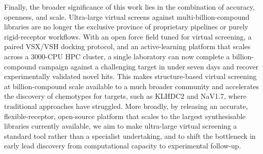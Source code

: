 \documentclass[11pt]{article}
\begin{document}
Finally, the broader significance of this work lies in the combination of
accuracy, openness, and scale. Ultra-large virtual screens against
multi-billion-compound libraries are no longer the exclusive province of
proprietary pipelines or purely rigid-receptor workflows. With an open
force field tuned for virtual screening, a paired VSX/VSH docking
protocol, and an active-learning platform that scales across a
3000-CPU HPC cluster, a single laboratory can now complete a
billion-compound campaign against a challenging target in under seven
days and recover experimentally validated novel hits. This makes
structure-based virtual screening at billion-compound scale available to
a much broader community and accelerates the discovery of chemotypes for
targets, such as KLHDC2 and NaV1.7, where traditional approaches have
struggled. More broadly, by releasing an accurate, flexible-receptor,
open-source platform that scales to the largest synthesisable libraries
currently available, we aim to make ultra-large virtual screening a
standard tool rather than a specialist undertaking, and to shift the
bottleneck in early lead discovery from computational capacity to
experimental follow-up.



\end{document}

